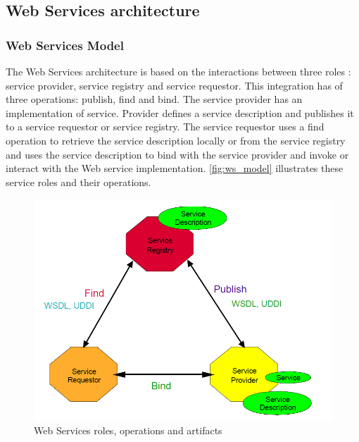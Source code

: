 \subsection{Web Services architecture}
\subsubsection{Web Services Model}
The Web Services architecture is based on the interactions between three
roles \cite{Kreger2001-WSC}:
service provider, service registry and service requestor. 
This integration has of three operations: publish, find and
bind. The service provider has an implementation of service. Provider defines a
service description and publishes it to a service requestor or service registry.
The service requestor uses a find operation to retrieve the service
description locally or from the service registry and uses the service description to bind with the
service provider and invoke or interact with the Web service implementation.
\autoref{fig:ws_model} illustrates these service roles and their operations.


\begin{center}
 \begin{figure}[H]
	\includegraphics[width=\textwidth]{../images/preliminaries/ws_model.png}
	\caption{Web Services roles, operations and artifacts \cite{Kreger2001-WSC}}
	\label{fig:ws_model}
 \end{figure}
\end{center}

